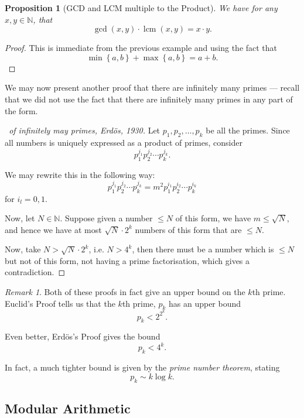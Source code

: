 \documentclass{article}
\newtheorem{proposition}[theorem]{Proposition}
\theoremstyle{definition}
\theoremstyle{remark}
\newtheorem{remark}[theorem]{Remark}
\newcommand{\pqty}[1]{\left(#1\right)}
\newcommand{\Bqty}[1]{\left\{#1\right\}}
\newcommand{\lcm}{\operatorname{lcm}}
\newcommand{\NN}{\mathbb{N}}
\begin{document}
\begin{proposition}[GCD and LCM multiple to the Product]
    We have for any \(x, y \in \NN\), that
    \[
        \gcd\pqty{x, y} \cdot \lcm\pqty{x, y} = x \cdot y.
    \]
\end{proposition}

\begin{proof}
    This is immediate from the previous example and using the fact that
    \[
        \min\Bqty{a, b} + \max\Bqty{a, b} = a + b.
    \]
\end{proof}

We may now present another proof that there are infinitely many primes --- recall that we did not use the fact that there are infinitely many primes in any part of the form.

\begin{proof}[\proofname\ of infinitely may primes, Erd\"{o}s, 1930]
    Let \(p_1, p_2, \ldots, p_k\) be all the primes. Since all numbers is uniquely expressed as a product of primes, consider
    \[
        p_1^{j_1} p_2^{j_2} \cdots p_k^{j_k}.
    \]

    We may rewrite this in the following way:
    \[
        p_1^{j_1} p_2^{j_2} \cdots p_k^{j_k} = m^2 p_1^{i_1} p_2^{i_2} \cdots p_k^{i_k}
    \]
    for \(i_l = 0, 1\).

    Now, let \(N \in \NN\). Suppose given a number \(\leq N\) of this form, we have \(m \leq \sqrt{N}\), and hence we have at most \(\sqrt{N} \cdot 2^k\) numbers of this form that are \(\leq N\).

    Now, take \(N > \sqrt{N} \cdot 2^k\), i.e. \(N > 4^k\), then there must be a number which is \(\leq N\) but not of this form, not having a prime factorisation, which gives a contradiction.
\end{proof}

\begin{remark}
    Both of these proofs in fact give an upper bound on the \(k\)th prime. Euclid's Proof tells us that the \(k\)th prime, \(p_k\) has an upper bound
    \[
        p_k < 2^{2^k}.
    \]

    Even better, Erd\"{o}s's Proof gives the bound
    \[
        p_k < 4^k.
    \]

    In fact, a much tighter bound is given by the \emph{prime number theorem}, stating
    \[
        p_k \sim k \log k.
    \]
\end{remark}

\subsection{Modular Arithmetic}
\label{sec:modular-arithmetic}
\end{document}
